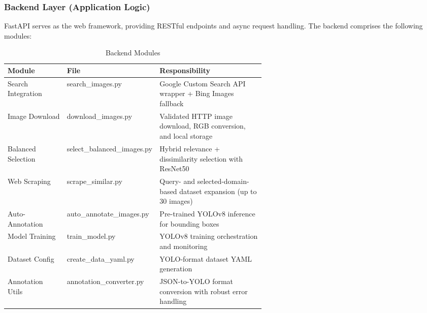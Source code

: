 \documentclass[12pt, letterpaper]{article}
\begin{document}
\subsubsection{Backend Layer (Application Logic)}

FastAPI serves as the web framework, providing RESTful endpoints and async request handling.
The backend comprises the following modules:

\begin{table}[H]
  \centering
  \caption{Backend Modules}
  \small
  \setlength{\tabcolsep}{4pt}
  \begin{tabularx}{\linewidth}{@{} p{0.23\linewidth} p{0.36\linewidth} X @{}}
    \toprule
    \textbf{Module} & \textbf{File} & \textbf{Responsibility} \\
    \midrule
    Search Integration
      & {\footnotesize\ttfamily search\_images.py}
      & Google Custom Search API wrapper + Bing Images fallback \\[2pt]
    Image Download
      & {\footnotesize\ttfamily download\_images.py}
      & Validated HTTP image download, RGB conversion, and local storage \\[2pt]
    Balanced Selection
      & {\ttfamily select\_balanced\_\allowbreak images.py}
      & Hybrid relevance + dissimilarity selection with ResNet50 \\[2pt]
    Web Scraping
      & {\footnotesize\ttfamily scrape\_similar.py}
      & Query- and selected-domain-based dataset expansion (up to 30 images) \\[2pt]
    Auto-Annotation
      & {\footnotesize\ttfamily auto\_annotate\_images.py}
      & Pre-trained YOLOv8 inference for bounding boxes \\[2pt]
    Model Training
      & {\footnotesize\ttfamily train\_model.py}
      & YOLOv8 training orchestration and monitoring \\[2pt]
    Dataset Config
      & {\footnotesize\ttfamily create\_data\_yaml.py}
      & YOLO-format dataset YAML generation \\[2pt]
    Annotation Utils
      & {\footnotesize\ttfamily annotation\_converter.py}
      & JSON-to-YOLO format conversion with robust error handling \\
    \bottomrule
  \end{tabularx}
\end{table}
\end{document}
